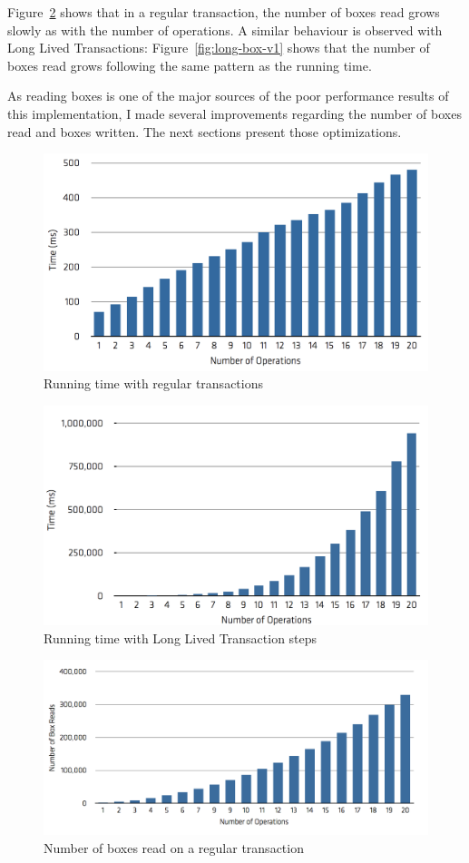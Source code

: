 \documentclass{llncs}
\begin{document}
Figure~\ref{fig:reg-box} shows that in a regular transaction, the
number of boxes read grows slowly as with the number of
operations. A similar behaviour is observed with Long Lived
Transactions: Figure~\ref{fig:long-box-v1} shows that the number of
boxes read grows following the same pattern as the running time.

As reading boxes is one of the major sources of the poor performance
results of this implementation, I made several improvements regarding
the number of boxes read and boxes written. The next sections present
those optimizations.

\begin{figure}
\centering
\includegraphics[width=0.9\linewidth]{time-regular}
\caption{Running time with regular transactions}
\label{fig:regTime}
\end{figure}

\begin{figure}
\centering
\includegraphics[width=0.9\linewidth]{time-long-v1}
\caption{Running time with Long Lived Transaction steps}
\end{figure}

\begin{figure}
\centering
\includegraphics[width=0.9\linewidth]{box-regular}
\caption{Number of boxes read on a regular transaction}
\label{fig:reg-box}
\end{figure}
\end{document}
